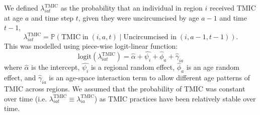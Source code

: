 \documentclass{article}
\begin{document}
\begin{appendix}
\noindent We defined $\lambda^{\text{TMIC}}_{iat}$ as the probability that an individual in region $i$ received TMIC at age $a$ and time step $t$, given they were uncircumcised by age $a-1$ and time $t-1$, 
\begin{equation} 
		\lambda^{\text{TMIC}}_{iat} = \mathbb{P}(\text{TMIC} \; \text{in} \; (i,a,t) \; | \; \text{Uncircumcised in} \; (i,a-1, t-1)). 
	\label{eqn::tmic}
\end{equation}
This was modelled using piece-wise logit-linear function:
\begin{equation*} 
	\text{logit}(\lambda^{\text{TMIC}}_{iat}) = \hat{\alpha} + \hat{\psi_i} + \hat{\phi}_a + \hat{\gamma}_{ia}
\end{equation*}
where $\hat{\alpha}$ is the intercept, $\hat{\psi_i}$ is a regional random effect, $\hat{\phi}_a$ is an age random effect, and $\hat{\gamma}_{ia}$ is an age-space interaction term to allow different age patterns of TMIC  across regions. We assumed that the probability of TMIC was constant over time (i.e. $\lambda^{\text{TMIC}}_{iat} \equiv \lambda^{\text{TMIC}}_{ia}$) as TMIC practices have been relatively stable over time. 


\end{appendix}
\end{document}
